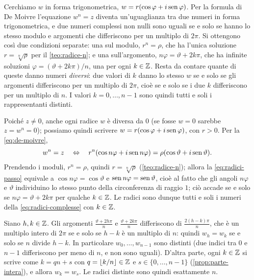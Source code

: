 \begin{schema}
\end{schema}

\begin{strategia}
Cerchiamo $w$ in forma trigonometrica, $w=r(\cos\varphi+i\operatorname{sen}\varphi)$. Per la formula
di De Moivre l'equazione $w^{n}=z$ diventa un'uguaglianza tra due numeri in forma
trigonometrica, e due numeri complessi non nulli sono uguali se e solo se hanno lo
stesso modulo e argomenti che differiscono per un multiplo di $2\pi$. Si ottengono così
due condizioni separate: una sul modulo, $r^{n}=\rho$, che ha l'unica soluzione
$r=\sqrt[n]\rho$ per il \cref{teo:radice-n}; e una sull'argomento,
$n\varphi=\vartheta+2k\pi$, che ha infinite soluzioni $\varphi=(\vartheta+2k\pi)/n$, una
per ogni $k\in\mathbb{Z}$. Resta da contare quante di queste danno numeri \emph{diversi}: due
valori di $k$ danno lo stesso $w$ se e solo se gli argomenti differiscono per un multiplo
di $2\pi$, cioè se e solo se i due $k$ differiscono per un multiplo di $n$. I valori
$k=0,\dots,n-1$ sono quindi tutti e soli i rappresentanti distinti.
\end{strategia}

\begin{dimostrazione}
Poiché $z\neq0$, anche ogni radice $w$ è diversa da $0$ (se fosse $w=0$ sarebbe
$z=w^{n}=0$); possiamo quindi scrivere $w=r(\cos\varphi+i\operatorname{sen}\varphi)$, con $r>0$. Per la
\eqref{eq:de-moivre},
\begin{equation}\label{eq:radici-passo}
  w^{n}=z \quad\Leftrightarrow\quad r^{n}(\cos n\varphi+i\operatorname{sen} n\varphi)=\rho(\cos\vartheta+i\operatorname{sen}\vartheta).
\end{equation}
Prendendo i moduli, $r^{n}=\rho$, quindi $r=\sqrt[n]\rho$ (\cref{teo:radice-n}); allora
la \eqref{eq:radici-passo} equivale a $\cos n\varphi=\cos\vartheta$ e
$\operatorname{sen} n\varphi=\operatorname{sen}\vartheta$, cioè al fatto che gli angoli $n\varphi$ e $\vartheta$
individuino lo stesso punto della circonferenza di raggio $1$; ciò accade se e solo se
$n\varphi=\vartheta+2k\pi$ per qualche $k\in\mathbb{Z}$. Le radici sono dunque tutti e soli i
numeri della \eqref{eq:radici-complesse} con $k\in\mathbb{Z}$.

Siano $h,k\in\mathbb{Z}$. Gli argomenti $\frac{\vartheta+2h\pi}{n}$ e $\frac{\vartheta+2k\pi}{n}$
differiscono di $\frac{2(h-k)\pi}{n}$, che è un multiplo intero di $2\pi$ se e solo se
$h-k$ è un multiplo di $n$: quindi $w_{h}=w_{k}$ se e solo se $n$ divide $h-k$. In
particolare $w_{0},\dots,w_{n-1}$ sono distinti (due indici tra $0$ e $n-1$ differiscono
per meno di $n$, e non sono uguali). D'altra parte, ogni $k\in\mathbb{Z}$ si scrive come
$k=qn+s$ con $q=\lfloor k/n\rfloor\in\mathbb{Z}$ e $s\in\{0,\dots,n-1\}$
(\cref{prop:parte-intera}), e allora $w_{k}=w_{s}$. Le radici distinte sono quindi
esattamente $n$.
\end{dimostrazione}


